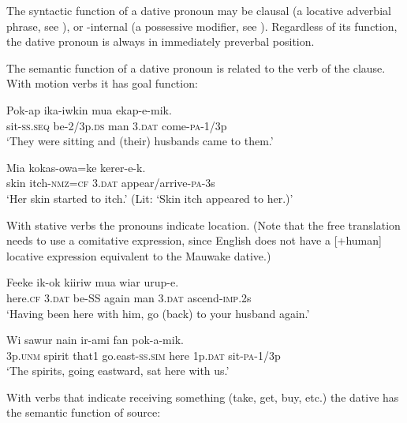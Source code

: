 The syntactic function of a dative pronoun may be clausal (a locative adverbial phrase, see ), or -internal (a possessive modifier, see ). Regardless of its function, the dative pronoun is always in immediately preverbal position. 

The semantic function of a dative pronoun is related to the verb of the clause. With motion verbs it has goal function: 

\ea%
\label{ex:3:x1781}
\gll Pok-ap ika-iwkin mua  ekap-e-mik. \\
sit-\textsc{ss}.\textsc{seq} be-2/3p.\textsc{ds} man 3.\textsc{dat} come-\textsc{pa}-1/3p\\
\glt`They were sitting and (their) husbands came to them.'
\z

\ea%
\label{ex:3:x580}
\gll Mia kokas-owa=ke  kerer-e-k. \\
skin itch-\textsc{nmz}=\textsc{cf} 3.\textsc{dat} appear/arrive-\textsc{pa}-3s\\
\glt`Her skin started to itch.' (Lit: `Skin itch appeared to her.)' 
\z

With stative verbs the pronouns indicate location. (Note that the free translation needs to use a comitative expression, since English does not have a [+human] locative expression equivalent to the Mauwake dative.) 

\ea%
\label{ex:3:x1782}
\gll Feeke  ik-ok kiiriw mua wiar urup-e. \\
here.\textsc{cf} 3.\textsc{dat} be-SS again man 3.\textsc{dat} ascend-\textsc{imp}.2s\\
\glt`Having been here with him, go (back) to your husband again.'
\z

\ea%
\label{ex:3:x1783}
\gll Wi sawur nain ir-ami fan  pok-a-mik.{\footnotemark} \\
3p.\textsc{unm} spirit that1 go.east-\textsc{ss}.\textsc{sim} here 1p.\textsc{dat} sit-\textsc{pa}-1/3p\\
\glt`The spirits, going eastward, sat here with us.'
\z


With verbs that indicate receiving something (take, get, buy, etc.) the dative has the semantic function of source:

